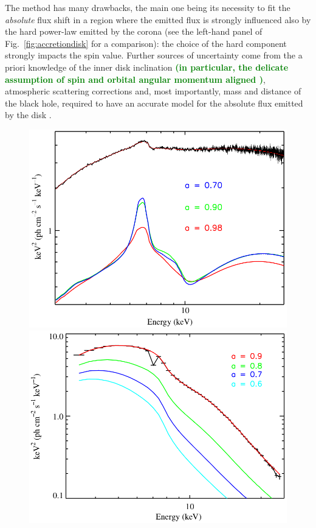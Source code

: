 \documentclass[a4paper,titlepage]{book}     	%
\newcommand{\erika}[1]{\textcolor{green}{\bf#1}}
\begin{document}
The method has many drawbacks, the main one being its necessity to fit the \textit{absolute} flux shift in a region where the emitted flux is strongly influenced also by the hard power-law emitted by the corona (see the left-hand panel of Fig.\ \ref{fig:accretiondisk} for a comparison): the choice of the hard component strongly impacts the spin value. Further sources of uncertainty come from the a priori knowledge of the inner disk inclination \erika{(in particular, the delicate assumption of spin and orbital angular momentum aligned \cite{BHspinmisaligned_2022})}, atmospheric scattering corrections and, most importantly, mass and distance of the black hole, required to have an accurate model for the absolute flux emitted by the disk \cite{Xbinaries_spinBHmeasure}.


\begin{figure}
	\begin{minipage}{.48\textwidth}
		\centering
		\includegraphics[width=\textwidth]{./images/spinreflection.png}
	\end{minipage}
	\hfill
	\begin{minipage}{.49\textwidth}
		\centering
		\includegraphics[width=\textwidth]{./images/spincontinuum.png}	

\end{minipage}
\end{figure}
\end{document}

